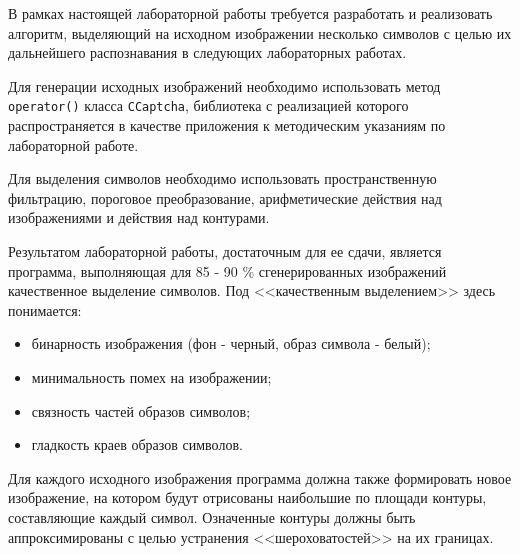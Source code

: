 
В рамках настоящей лабораторной работы требуется разработать и реализовать алгоритм, выделяющий на исходном изображении несколько символов с целью их дальнейшего распознавания в следующих лабораторных работах.

Для генерации исходных изображений необходимо использовать метод \verb|operator()| класса \verb|CCaptcha|, библиотека с реализацией которого распространяется в качестве приложения к методическим указаниям по лабораторной работе.

Для выделения символов необходимо использовать пространственную фильтрацию, пороговое преобразование, арифметические действия над изображениями и действия над контурами.

Результатом лабораторной работы, достаточным для ее сдачи, является программа, выполняющая для 85 - 90 \% сгенерированных изображений качественное выделение символов. Под <<качественным выделением>> здесь понимается:

\begin{itemize}

	\item бинарность изображения (фон - черный, образ символа - белый);
	\item минимальность помех на изображении;
	\item связность частей образов символов;
	\item гладкость краев образов символов.

\end{itemize}

Для каждого исходного изображения программа должна также формировать новое изображение, на котором будут отрисованы наибольшие по площади контуры, составляющие каждый символ. Означенные контуры должны быть аппроксимированы с целью устранения <<шероховатостей>> на их границах.

